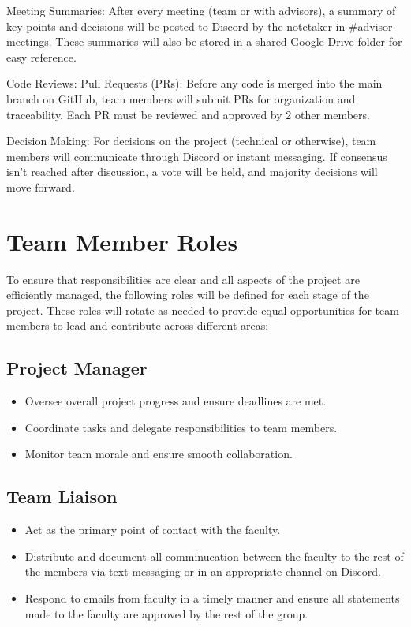 \documentclass{article}
\begin{document}
\begin{flushleft}
  Meeting Summaries:
  After every meeting (team or with advisors), a summary of key points and decisions will be posted to Discord by the notetaker in \#advisor-meetings. These summaries will also be stored in a shared Google Drive folder for easy reference.\par

  Code Reviews:
  Pull Requests (PRs): Before any code is merged into the main branch on GitHub, team members will submit PRs for organization and traceability. Each PR must be reviewed and approved by 2 other members.\par

  Decision Making:
  For decisions on the project (technical or otherwise), team members will communicate through Discord or instant messaging. If consensus isn’t reached after discussion, a vote will be held, and majority decisions will move forward.\par
\end{flushleft}


\section{Team Member Roles}

To ensure that responsibilities are clear and all aspects of the project are efficiently managed, the following roles will be defined for each stage of the project. These roles will rotate as needed to provide equal opportunities for team members to lead and contribute across different areas:

\subsection{Project Manager} 
  \begin{itemize}
    \item Oversee overall project progress and ensure deadlines are met.
    \item Coordinate tasks and delegate responsibilities to team members.
    \item Monitor team morale and ensure smooth collaboration.
  \end{itemize}

\subsection{Team Liaison}
  \begin{itemize}
    \item Act as the primary point of contact with the faculty.
    \item Distribute and document all comminucation between the faculty to the rest of the members via text messaging or in an appropriate channel on Discord.
    \item Respond to emails from faculty in a timely manner and ensure all statements made to the faculty are approved by the rest of the group.
  \end{itemize}
\end{document}
